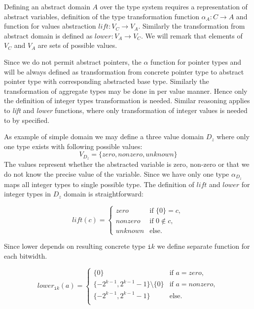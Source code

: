 Defining an abstract domain $A$ over the \LLVM type system requires a representation of
abstract variables, definition of the type transformation function $\alpha_A \colon C \to A$
and function for values abstraction $\textit{lift} \colon V_C \to V_A$.
Similarly the transformation from abstract domain is defined as
$\textit{lower} \colon V_A \to {V_C}$. We will remark that elements of $V_C$ and
$V_A$ are sets of possible values.

Since we do not permit abstract pointers, the $\alpha$ function for pointer types and will be
always defined as transformation from concrete pointer type to abstract pointer
type with corresponding abstracted base type. Similarly the transformation of
aggregate types may be done in per value manner. Hence only the definition of
integer types transformation is needed. Similar reasoning applies to
\textit{lift} and \textit{lower} functions, where only transformation of integer
values is needed to by specified.

As example of simple domain we may define a three value domain $D_z$ where only
one type exists with following possible values:
\[ V_{D_z} = \{ \textit{zero}, \textit{nonzero}, \textit{unknown} \}\]
The values represent whether the abstracted variable is zero, non-zero or that we do
not know the precise value of the variable. Since we have only one type
$\alpha_{D_z}$ maps all integer types to single possible type.
The definition of $\textit{lift}$ and $\textit{lower}$ for integer
types in $D_z$ domain is straightforward:

\[
  lift(c) = \left.
  \begin{cases}
    \textit{zero}    & \text{if } \{0\} = c, \\
    \textit{nonzero} & \text{if } 0 \not \in c, \\
    \textit{unknown} & \text{else.}
  \end{cases}
\]

\noindent
Since lower depends on resulting concrete type $\texttt{i}k$ we define separate
function for each bitwidth.

\[
  lower_{\texttt{i}k}(a) = \left.
  \begin{cases}
    \{0\}    & \text{if } a = \textit{zero},\\
    \{-2^{k-1}, 2^{k - 1} - 1\} \setminus \{0\} & \text{if } a = \textit{nonzero}, \\
    \{-2^{k-1}, 2^{k - 1} - 1\} & \text{else}. \\
  \end{cases}
\]

